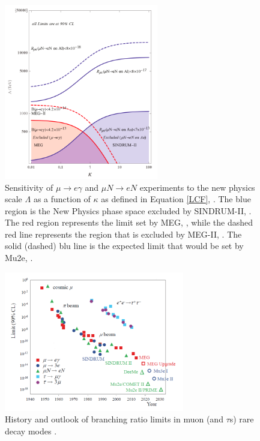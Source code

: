 \begin{figure}[!h]
\centering
\includegraphics[width =0.6\textwidth]{figures/png/Screenshot_20240313_120457.png}
\caption[Sensitivity of $\mu \rightarrow e\gamma$ and $\mu N \rightarrow eN$ experiments.]{Sensitivity of $\mu \rightarrow e\gamma$ and $\mu N \rightarrow eN$ experiments to the new physics
scale $\Lambda$ as a function of $\kappa$ as defined in Equation \ref{LCF}, \cite{CGroup:2022tli}. The blue region is the New
Physics phase space excluded by SINDRUM-II, \cite{SINDRUMII:2006dvw}. The red region represents the
limit set by MEG, \cite{megi}, while the dashed red line represents the region that is
excluded by MEG-II, \cite{megiicollaboration2024search}. The solid (dashed) blu line is the
expected limit that would be set by Mu2e, \cite{universe9010054}.}
\label{fig:muchannelbr}
\end{figure}
\begin{figure}[!h]
  \centering
  \includegraphics[width =0.7\textwidth]{figures/png/Screenshot_20240912_093047.png}
  \caption[Branching ratio limits in muon rare decay modes.]{History and outlook of branching ratio limits in muon (and $\tau$s) rare decay modes \cite{Cei_2020}.}
  \label{fig:muchannel}
  \end{figure}
